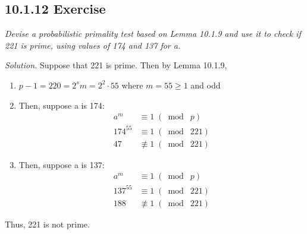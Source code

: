 \documentclass{article}
\begin{document}
\subsection*{10.1.12 Exercise} 
\quad \textit{Devise a probabilistic primality test based on Lemma 10.1.9 and use it to check if 221 is prime, using values of 174 and 137 for a.}

\textit{Solution.} Suppose that 221 is prime. Then by Lemma 10.1.9,
\begin{enumerate}
    \item $p-1 = 220 = 2^sm = 2^2 \cdot 55$ where $m = 55 \geq 1$ and odd
    \item Then, suppose a is 174:
    \begin{align*}
        &&a^m &\equiv 1 \;(\bmod\; p)&&\\
        &&174^{55} &\equiv 1 \;(\bmod\; 221)&&\\
        &&47 &\not\equiv 1 \;(\bmod\; 221)&&
    \end{align*}
    \item Then, suppose a is 137:
    \begin{align*}
        &&a^m &\equiv 1 \;(\bmod\; p)&&\\
        &&137^{55} &\equiv 1 \;(\bmod\; 221)&&\\
        &&188 &\not\equiv 1 \;(\bmod\; 221)&&
    \end{align*}
\end{enumerate}
Thus, 221 is not prime.
\end{document}
